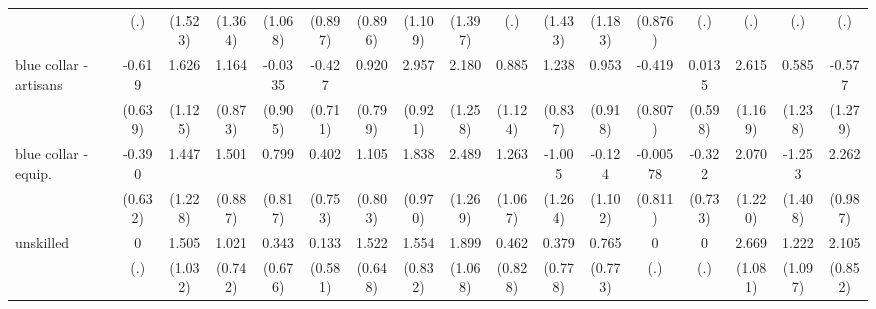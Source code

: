 {\begin{tabular}{l*{16}{c}}
                    &         (.)         &     (1.523)         &     (1.364)         &     (1.068)         &     (0.897)         &     (0.896)         &     (1.109)         &     (1.397)         &         (.)         &     (1.433)         &     (1.183)         &     (0.876)         &         (.)         &         (.)         &         (.)         &         (.)         \\
[1em]
blue collar - artisans&      -0.619         &       1.626         &       1.164         &     -0.0335         &      -0.427         &       0.920         &       2.957\sym{**} &       2.180         &       0.885         &       1.238         &       0.953         &      -0.419         &      0.0135         &       2.615\sym{*}  &       0.585         &      -0.577         \\
                    &     (0.639)         &     (1.125)         &     (0.873)         &     (0.905)         &     (0.711)         &     (0.799)         &     (0.921)         &     (1.258)         &     (1.124)         &     (0.837)         &     (0.918)         &     (0.807)         &     (0.598)         &     (1.169)         &     (1.238)         &     (1.279)         \\
[1em]
blue collar - equip.&      -0.390         &       1.447         &       1.501         &       0.799         &       0.402         &       1.105         &       1.838         &       2.489\sym{*}  &       1.263         &      -1.005         &      -0.124         &    -0.00578         &      -0.322         &       2.070         &      -1.253         &       2.262\sym{*}  \\
                    &     (0.632)         &     (1.228)         &     (0.887)         &     (0.817)         &     (0.753)         &     (0.803)         &     (0.970)         &     (1.269)         &     (1.067)         &     (1.264)         &     (1.102)         &     (0.811)         &     (0.733)         &     (1.220)         &     (1.408)         &     (0.987)         \\
[1em]
unskilled           &           0         &       1.505         &       1.021         &       0.343         &       0.133         &       1.522\sym{*}  &       1.554         &       1.899         &       0.462         &       0.379         &       0.765         &           0         &           0         &       2.669\sym{*}  &       1.222         &       2.105\sym{*}  \\
                    &         (.)         &     (1.032)         &     (0.742)         &     (0.676)         &     (0.581)         &     (0.648)         &     (0.832)         &     (1.068)         &     (0.828)         &     (0.778)         &     (0.773)         &         (.)         &         (.)         &     (1.081)         &     (1.097)         &     (0.852)         \\

\end{tabular}}
